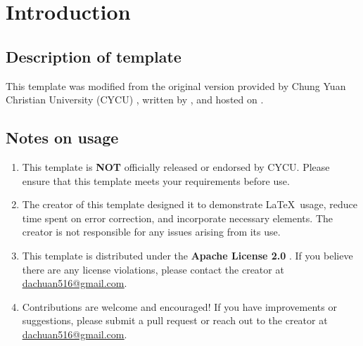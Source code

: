 \section{Introduction}

\subsection{Description of template}

This template was modified from the original version provided by Chung Yuan Christian University (CYCU) \cite{cycu_thesis_template}, written by \citeauthor{belongtothenight} \cite{belongtothenight}, and hosted on \citeauthor{CYCU-AIoT-System-Lab} \cite{CYCU-AIoT-System-Lab}.

\subsection{Notes on usage}

\begin{enumerate} 
    \item This template is \textbf{NOT} officially released or endorsed by CYCU. Please ensure that this template meets your requirements before use. 
    \item The creator of this template designed it to demonstrate \LaTeX\ usage, reduce time spent on error correction, and incorporate necessary elements. The creator is not responsible for any issues arising from its use. 
    \item This template is distributed under the \textbf{Apache License 2.0} \cite{apache}. If you believe there are any license violations, please contact the creator at \underline{\href{mailto:dachuan516@gmail.com}{dachuan516@gmail.com}}. 
    \item Contributions are welcome and encouraged! If you have improvements or suggestions, please submit a pull request or reach out to the creator at \underline{\href{mailto:dachuan516@gmail.com}{dachuan516@gmail.com}}. 
\end{enumerate}

\clearpage
